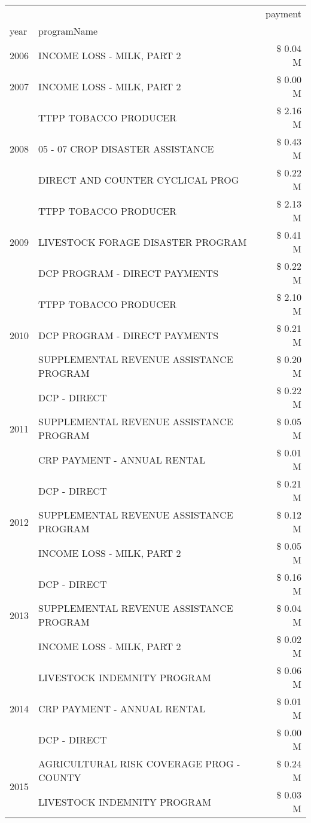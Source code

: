 \begin{tabular}{llr}
\toprule
 &  & payment \\
year & programName &  \\
\midrule
2006 & INCOME LOSS - MILK, PART 2 & \$ 0.04 M \\
\cline{1-3}
2007 & INCOME LOSS - MILK, PART 2 & \$ 0.00 M \\
\cline{1-3}
\multirow[t]{3}{*}{2008} & TTPP TOBACCO PRODUCER & \$ 2.16 M \\
 & 05 - 07 CROP DISASTER ASSISTANCE & \$ 0.43 M \\
 & DIRECT AND COUNTER CYCLICAL PROG & \$ 0.22 M \\
\cline{1-3}
\multirow[t]{3}{*}{2009} & TTPP TOBACCO PRODUCER & \$ 2.13 M \\
 & LIVESTOCK FORAGE DISASTER  PROGRAM & \$ 0.41 M \\
 & DCP PROGRAM - DIRECT PAYMENTS & \$ 0.22 M \\
\cline{1-3}
\multirow[t]{3}{*}{2010} & TTPP TOBACCO PRODUCER & \$ 2.10 M \\
 & DCP PROGRAM - DIRECT PAYMENTS & \$ 0.21 M \\
 & SUPPLEMENTAL REVENUE ASSISTANCE PROGRAM & \$ 0.20 M \\
\cline{1-3}
\multirow[t]{3}{*}{2011} & DCP - DIRECT & \$ 0.22 M \\
 & SUPPLEMENTAL REVENUE ASSISTANCE PROGRAM & \$ 0.05 M \\
 & CRP PAYMENT - ANNUAL RENTAL & \$ 0.01 M \\
\cline{1-3}
\multirow[t]{3}{*}{2012} & DCP - DIRECT & \$ 0.21 M \\
 & SUPPLEMENTAL REVENUE ASSISTANCE PROGRAM & \$ 0.12 M \\
 & INCOME LOSS - MILK, PART 2 & \$ 0.05 M \\
\cline{1-3}
\multirow[t]{3}{*}{2013} & DCP - DIRECT & \$ 0.16 M \\
 & SUPPLEMENTAL REVENUE ASSISTANCE PROGRAM & \$ 0.04 M \\
 & INCOME LOSS - MILK, PART 2 & \$ 0.02 M \\
\cline{1-3}
\multirow[t]{3}{*}{2014} & LIVESTOCK INDEMNITY PROGRAM & \$ 0.06 M \\
 & CRP PAYMENT - ANNUAL RENTAL & \$ 0.01 M \\
 & DCP - DIRECT & \$ 0.00 M \\
\cline{1-3}
\multirow[t]{3}{*}{2015} & AGRICULTURAL RISK COVERAGE PROG - COUNTY & \$ 0.24 M \\
 & LIVESTOCK INDEMNITY PROGRAM & \$ 0.03 M \\

\end{tabular}
